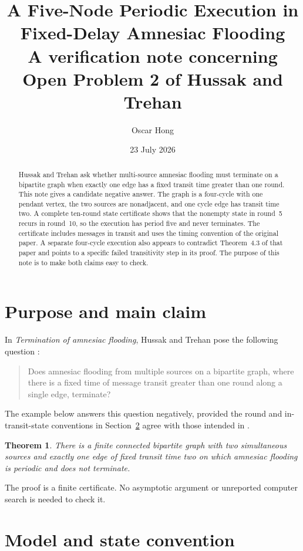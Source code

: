 \documentclass[11pt]{article}
\title{\textbf{A Five-Node Periodic Execution in\\
Fixed-Delay Amnesiac Flooding}\\[0.35em]
\large A verification note concerning Open Problem 2 of Hussak and Trehan}
\author{Oscar Hong}
\date{23 July 2026}
\newtheorem{theorem}{Theorem}
\begin{document}
\maketitle

\begin{abstract}
Hussak and Trehan ask whether multi-source amnesiac flooding must terminate
on a bipartite graph when exactly one edge has a fixed transit time greater
than one round.  This note gives a candidate negative answer.  The graph is a
four-cycle with one pendant vertex, the two sources are nonadjacent, and one
cycle edge has transit time two.  A complete ten-round state certificate
shows that the nonempty state in round~5 recurs in round~10, so the execution
has period five and never terminates.  The certificate includes messages in
transit and uses the timing convention of the original paper.  A separate
four-cycle execution also appears to contradict Theorem~4.3 of that paper and
points to a specific failed transitivity step in its proof.  The purpose of
this note is to make both claims easy to check.
\end{abstract}

\section{Purpose and main claim}

In \emph{Termination of amnesiac flooding}, Hussak and Trehan pose the
following question \cite[Open Problem~2]{HT2023}:
\begin{quote}
Does amnesiac flooding from multiple sources on a bipartite graph, where
there is a fixed time of message transit greater than one round along a
single edge, terminate?
\end{quote}
The example below answers this question negatively, provided the round and
in-transit-state conventions in Section~\ref{sec:model} agree with those
intended in \cite{HT2023}.

\begin{theorem}\label{thm:main}
There is a finite connected bipartite graph with two simultaneous sources
and exactly one edge of fixed transit time two on which amnesiac flooding is
periodic and does not terminate.
\end{theorem}

The proof is a finite certificate.  No asymptotic argument or unreported
computer search is needed to check it.

\section{Model and state convention}\label{sec:model}
\end{document}
